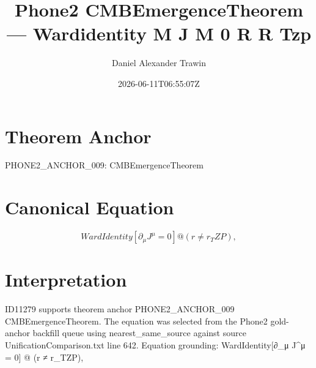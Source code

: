 \documentclass[11pt]{article}
\title{Phone2 CMBEmergenceTheorem — Wardidentity Μ J Μ 0 R R Tzp}
\author{Daniel Alexander Trawin}
\date{2026-06-11T06:55:07Z}
\begin{document}
\maketitle
\section*{Theorem Anchor}
PHONE2_ANCHOR_009: CMBEmergenceTheorem
\section*{Canonical Equation}
\[
WardIdentity[∂_μ J^μ = 0] @ (r ≠ r_TZP),
\]
\section*{Interpretation}
ID11279 supports theorem anchor PHONE2_ANCHOR_009 CMBEmergenceTheorem. The equation was selected from the Phone2 gold-anchor backfill queue using nearest_same_source against source UnificationComparison.txt line 642. Equation grounding: WardIdentity[∂_μ J^μ = 0] @ (r ≠ r_TZP),
\end{document}
